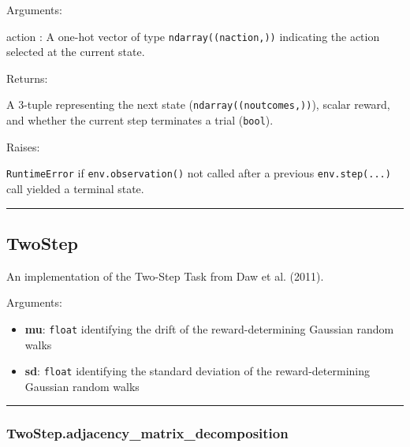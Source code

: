 Arguments:

action : A one-hot vector of type \texttt{ndarray((naction,))}
indicating the action selected at the current state.

Returns:

A 3-tuple representing the next state (\texttt{ndarray((noutcomes,))}),
scalar reward, and whether the current step terminates a trial
(\texttt{bool}).

Raises:

\texttt{RuntimeError} if \texttt{env.observation()} not called after a
previous \texttt{env.step(...)} call yielded a terminal state.

\begin{center}\rule{0.5\linewidth}{\linethickness}\end{center}

\subsection{TwoStep}\label{twostep}

\begin{Shaded}
\begin{Highlighting}[]
\end{Highlighting}
\end{Shaded}

An implementation of the Two-Step Task from Daw et al. (2011).

Arguments:

\begin{itemize}
\tightlist
\item
  \textbf{mu}: \texttt{float} identifying the drift of the
  reward-determining Gaussian random walks
\item
  \textbf{sd}: \texttt{float} identifying the standard deviation of the
  reward-determining Gaussian random walks
\end{itemize}

\begin{center}\rule{0.5\linewidth}{\linethickness}\end{center}

\subsubsection{TwoStep.adjacency\_matrix\_decomposition}\label{twostep.adjacency_matrix_decomposition}

\begin{Shaded}
\begin{Highlighting}[]
\NormalTok{)}
\end{Highlighting}
\end{Shaded}

